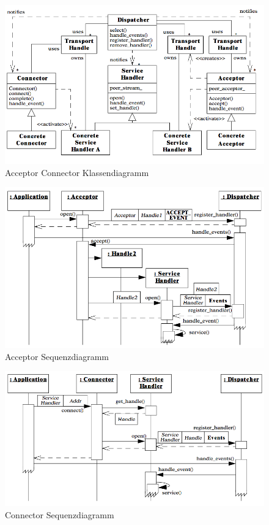 \begin{figure}[H]
	\centering
	\includegraphics[width=12cm]{content/posa2/acceptor-connector/images/class-diagram.png}
	\caption{Acceptor Connector Klassendiagramm}
\end{figure}


\begin{figure}[H]
	\centering
	\includegraphics[width=12cm]{content/posa2/acceptor-connector/images/acceptor-ssd.png}
	\caption{Acceptor Sequenzdiagramm}
\end{figure}


\begin{figure}[H]
	\centering
	\includegraphics[width=12cm]{content/posa2/acceptor-connector/images/connector-ssd.png}
	\caption{Connector Sequenzdiagramm}
\end{figure}



